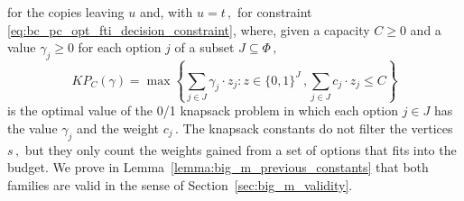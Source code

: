 \documentclass[11pt,a4paper]{report}
\theoremstyle{definition}
\theoremstyle{remark}
\begin{document}
for the copies leaving $u$ and, with $u = t\,,$ for constraint \eqref{eq:bc_pc_opt_fti_decision_constraint}, where, given a capacity $C \geq 0$ and a value $\gamma_j \geq 0$ for each option $j$ of a subset $J \subseteq \Phi\,,$
\begin{equation}
  KP_C(\gamma) = \max\left\{\sum_{j \in J} \gamma_j \cdot z_j : z \in \{0,1\}^J\,, \sum_{j \in J} c_j \cdot z_j \leq C\right\}
\end{equation}
is the optimal value of the 0/1 knapsack problem in which each option $j \in J$ has the value $\gamma_j$ and the weight $c_j\,.$ The knapsack constants do not filter the vertices $s\,,$ but they only count the weights gained from a set of options that fits into the budget. We prove in Lemma~\ref{lemma:big_m_previous_constants} that both families are valid in the sense of Section~\ref{sec:big_m_validity}.

\noindent
\end{document}
